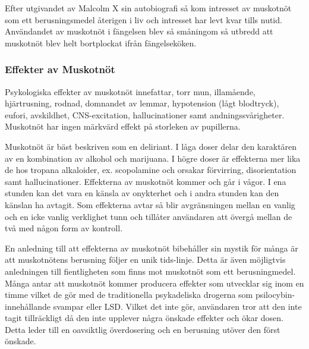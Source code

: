Efter utgivandet av Malcolm X sin autobiografi så kom intresset av muskotnöt som ett berusningsmedel återigen i liv och intresset har levt kvar tills nutid.
Användandet av muskotnöt i fängelsen blev så småningom så utbredd att muskotnöt blev helt bortplockat ifrån fängelseköken.


\subsubsection{Effekter av Muskotnöt}

Psykologiska effekter av muskotnöt innefattar, torr mun, illamående, hjärtrusning, rodnad,
domnandet av lemmar, hypotension (lågt blodtryck), eufori, avskildhet, CNS-excitation,
hallucinationer samt andningssvårigheter.
Muskotnöt har ingen märkvärd effekt på storleken av pupillerna. \cite{entheogenreview}

Muskotnöt är bäst beskriven som en deliriant. I låga doser delar den karaktären av en kombination av alkohol och marijuana. I högre doser är effekterna mer lika de hos tropana alkaloider, ex. scopolamine och orsakar förvirring, disorientation samt hallucinationer.
Effekterna av muskotnöt kommer och går i vågor. I ena stunden kan det vara en känsla av onykterhet och i andra stunden kan den känslan ha avtagit.
Som effekterna avtar så blir avgränsningen mellan en vanlig och en icke vanlig verklighet tunn och tillåter användaren att övergå mellan de två med någon form av kontroll.

En anledning till att effekterna av muskotnöt bibehåller sin mystik för många är att muskotnötens berusning följer en unik tids-linje. Detta är även möjligtvis anledningen till fientligheten som finns mot muskotnöt som ett berusningmedel. Många antar att muskotnöt kommer producera effekter som utvecklar sig inom en timme vilket de gör med de traditionella psykadeliska drogerna som psilocybin-innehållande svampar eller LSD. Vilket det inte gör, användaren tror att den inte tagit tillräckligt då den inte upplever några önskade effekter och ökar dosen. Detta leder till en oavsiktlig överdosering och en berusning utöver den först önskade.

\\





